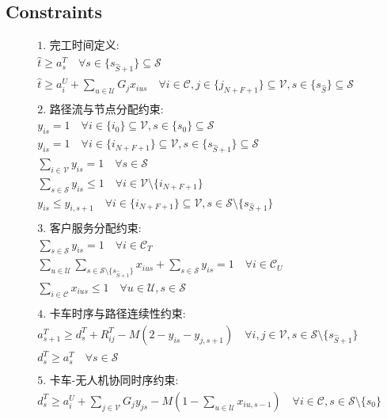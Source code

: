 \documentclass[11pt]{article}
\begin{document}
\subsection*{Constraints}
\[\begin{aligned}
&\text{1. 完工时间定义:} \\
&\hat{t} \ge a^T_s \quad \forall s \in \{s_{\hat{S}+1}\} \subseteq \mathcal{S} \\
&\hat{t} \ge a^U_i + \sum_{u \in \mathcal{U}} G_j x_{ius} \quad \forall i \in \mathcal{C}, j \in \{j_{N+F+1}\} \subseteq \mathcal{V}, s \in \{s_{\hat{S}}\} \subseteq \mathcal{S} \\
\\
&\text{2. 路径流与节点分配约束:} \\
&y_{is} = 1 \quad \forall i \in \{i_0\} \subseteq \mathcal{V}, s \in \{s_0\} \subseteq \mathcal{S} \\
&y_{is} = 1 \quad \forall i \in \{i_{N+F+1}\} \subseteq \mathcal{V}, s \in \{s_{\hat{S}+1}\} \subseteq \mathcal{S} \\
&\sum_{i \in \mathcal{V}} y_{is} = 1 \quad \forall s \in \mathcal{S} \\
&\sum_{s \in \mathcal{S}} y_{is} \le 1 \quad \forall i \in \mathcal{V} \setminus \{i_{N+F+1}\} \\
&y_{is} \le y_{i,s+1} \quad \forall i \in \{i_{N+F+1}\} \subseteq \mathcal{V}, s \in \mathcal{S} \setminus \{s_{\hat{S}+1}\} \\
\\
&\text{3. 客户服务分配约束:} \\
&\sum_{s \in \mathcal{S}} y_{is} = 1 \quad \forall i \in \mathcal{C}_T \\
&\sum_{u \in \mathcal{U}} \sum_{s \in \mathcal{S} \setminus \{s_{\hat{S}+1}\}} x_{ius} + \sum_{s \in \mathcal{S}} y_{is} = 1 \quad \forall i \in \mathcal{C}_U \\
&\sum_{i \in \mathcal{C}} x_{ius} \le 1 \quad \forall u \in \mathcal{U}, s \in \mathcal{S} \\
\\
&\text{4. 卡车时序与路径连续性约束:} \\
&a^T_{s+1} \ge d^T_s + R^T_{ij} - M(2 - y_{is} - y_{j,s+1}) \quad \forall i, j \in \mathcal{V}, s \in \mathcal{S} \setminus \{s_{\hat{S}+1}\} \\
&d^T_s \ge a^T_s \quad \forall s \in \mathcal{S} \\
\\
&\text{5. 卡车-无人机协同时序约束:} \\
&d^T_s \ge a^U_i + \sum_{j \in \mathcal{V}} G_j y_{js} - M\left(1 - \sum_{u \in \mathcal{U}} x_{iu,s-1}\right) \quad \forall i \in \mathcal{C}, s \in \mathcal{S} \setminus \{s_0\} \\

\end{aligned}\]
\end{document}
